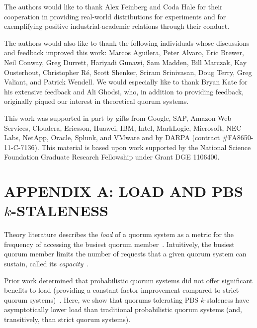 \documentclass{vldb}
\newcommand{\sectionskip}{-0em}
\begin{document}
The authors would like to thank Alex Feinberg and Coda Hale for their
cooperation in providing real-world distributions for experiments and for
exemplifying positive industrial-academic relations through their conduct.

The authors would also like to thank the following individuals whose
discussions and feedback improved this work: Marcos Aguilera, Peter
Alvaro, Eric Brewer, Neil Conway, Greg Durrett, Hariyadi Gunawi, Sam
Madden, Bill Marczak, Kay Ousterhout, Christopher R\'e, Scott Shenker,
Sriram Srinivasan, Doug Terry, Greg Valiant, and Patrick Wendell.  We
would especially like to thank Bryan Kate for his extensive feedback
and Ali Ghodsi, who, in addition to providing feedback, originally
piqued our interest in theoretical quorum systems.

This work was supported in part by gifts from Google, SAP,
Amazon Web Services, Cloudera, Ericsson, Huawei, IBM, Intel,
MarkLogic, Microsoft, NEC Labs, NetApp, Oracle, Splunk, and VMware and
by DARPA (contract \#FA8650-11-C-7136).  This material is based upon
work supported by the National Science Foundation Graduate Research
Fellowship under Grant DGE 1106400.

\balance

{\small


}

\vspace{\sectionskip}
\section*{APPENDIX A: LOAD AND PBS {\large$k$}-STALENESS}
Theory literature describes the \textit{load} of a quorum system as a
metric for the frequency of accessing the busiest quorum
member~\cite[Definition 3.2]{quorumsystems}.  Intuitively, the busiest
quorum member limits the number of requests that a given quorum system
can sustain, called its \textit{capacity}~\cite[Corollary
  3.9]{quorumsystems}.

Prior work determined that probabilistic quorum systems did not offer
significant benefits to load (providing a constant factor improvement
compared to strict quorum systems)~\cite{prob-quorum}.  Here, we show
that quorums tolerating PBS $k$-staleness have asymptotically lower
load than traditional probabilistic quorum systems (and, transitively,
than strict quorum systems).
\end{document}
